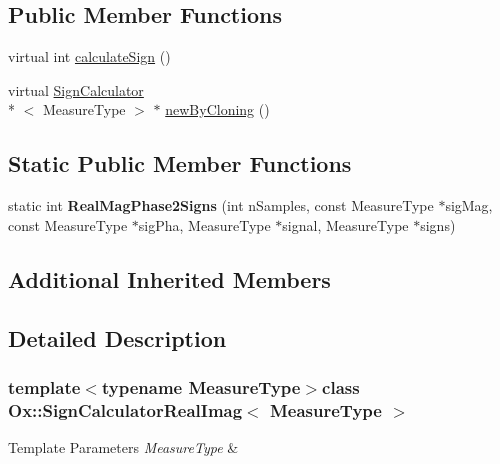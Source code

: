 \subsection*{Public Member Functions}
\begin{DoxyCompactItemize}
\item 
virtual int \hyperlink{class_ox_1_1_sign_calculator_real_imag_ae3f3c8f8e8ea994da7ad56f4a180cb36}{calculate\-Sign} ()
\item 
virtual \hyperlink{class_ox_1_1_sign_calculator}{Sign\-Calculator}\\*
$<$ Measure\-Type $>$ $\ast$ \hyperlink{class_ox_1_1_sign_calculator_real_imag_ae3340d1ac5728efcaf3d5a9299f01f2c}{new\-By\-Cloning} ()
\end{DoxyCompactItemize}
\subsection*{Static Public Member Functions}
\begin{DoxyCompactItemize}
\item 
\hypertarget{class_ox_1_1_sign_calculator_real_imag_a916a7be502489b814bd3b147075ae31d}{static int {\bfseries Real\-Mag\-Phase2\-Signs} (int n\-Samples, const Measure\-Type $\ast$sig\-Mag, const Measure\-Type $\ast$sig\-Pha, Measure\-Type $\ast$signal, Measure\-Type $\ast$signs)}\label{class_ox_1_1_sign_calculator_real_imag_a916a7be502489b814bd3b147075ae31d}

\end{DoxyCompactItemize}
\subsection*{Additional Inherited Members}


\subsection{Detailed Description}
\subsubsection*{template$<$typename Measure\-Type$>$class Ox\-::\-Sign\-Calculator\-Real\-Imag$<$ Measure\-Type $>$}


\begin{DoxyTemplParams}{Template Parameters}
{\em Measure\-Type} & \\
\hline
\end{DoxyTemplParams}


